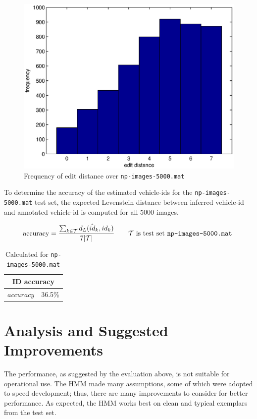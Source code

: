 \documentclass[a4paper,12pt]{article}
\newcommand{\test}{\ensuremath{\mathcal{T}}}
\begin{document}
\begin{figure}[ht]
\begin{center}
\includegraphics[width=0.75\linewidth]{matlab/hamming.eps}
\caption{ Frequency of edit distance over \texttt{np-images-5000.mat}  } 
\label{fig:editdistance}
\end{center}
\end{figure}

To determine the accuracy of the estimated vehicle-ids for the
\texttt{np-images-5000.mat} test set, the expected Levenstein distance
between inferred vehicle-id and annotated vehicle-id is computed for
all 5000 images.

\[ \text{accuracy} = \frac{\sum_{k \in \test}
  d_L(\hat{id}_k,id_k)}{7|\test|} \qquad \test \text{ is test set
  \texttt{np-images-5000.mat} }  \]

\begin{table}[ht]
\begin{center}
\begin{tabular}{|l|l|}
  \hline
  \multicolumn{2}{|c|}{ID accuracy} \\
  \hline
  $accuracy$ & 36.5\% \\
  \hline
\end{tabular}
\caption{Calculated for \texttt{np-images-5000.mat}}
\end{center}
\end{table}

\section{Analysis and Suggested Improvements}
The performance, as suggested by the evaluation above, is not suitable
for operational use. The HMM made many assumptions, some of which were
adopted to speed development; thus, there are many improvements to
consider for better performance. As expected, the HMM works best on
clean and typical exemplars from the test set.
\end{document}
